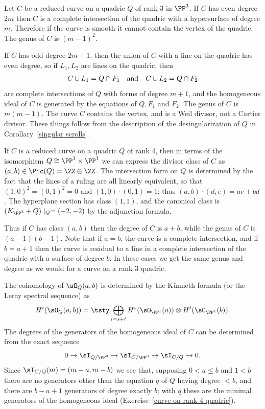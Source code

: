 \begin{example}
Let $C$ be a reduced curve on a quadric $Q$ of rank 3 in $\PP^{3}$. 
If $C$ has even degree $2m$ then $C$ is a complete intersection
of the quadric with a hypersurface of degree $m$. Therefore if the curve is smooth it cannot contain the vertex of the quadric. The genus of $C$ is $(m-1)^{2}$.

If $C$ has odd degree $2m+1$, then the union of $C$ with a line on the quadric has even degree,
so if $L_{1}, L_{2}$ are lines on the quadric, then 
$$
C\cup L_{1} = Q\cap F_{1} \quad\hbox{and}\quad C\cup L_{2} = Q\cap F_{2}
$$
are complete intersections of $Q$ with forms of degree $m+1$, and the homogeneous ideal of $C$ is generated by the equations
of $Q,F_{1}$ and $F_{2}$. The genus of $C$ is $m(m-1)$. The curve $C$ contains the vertex, and is a 
%
%
Weil divisor, not a Cartier divisor. These things follow from the description of the desingularization
of $Q$ in Corollary~\ref{singular scrolls}.
\end{example}

\begin{example}
\label{curves on quadrics}
If $C$ is a reduced curve on a quadric $Q$ of rank 4, then in terms of the isomorphism
$Q \cong \PP^{1}\times \PP^{1}$ we can express the divisor class of $C$ as $(a,b)\in \Pic(Q) = \ZZ\oplus \ZZ$.
The intersection form on $Q$ is determined by the fact that the lines of a ruling are all linearly equivalent,
so that $(1,0)^{2} = (0,1)^2=0$ and $(1,0)\cdot (0,1) = 1$; thus $(a,b)\cdot (d,e) = ae+bd$. The hyperplane section
has class $(1,1)$, and the canonical class is $(K_{\PP^{3}}+Q)\mid_{Q} = (-2,-2)$ by the adjunction formula. 

Thus
if $C$ has class $(a,b)$ then the degree of $C$ is $a+b$, while the genus of $C$ is $(a-1)(b-1)$. Note that 
if  $a =b$, the curve is a complete intersection, and if $b = a+1$ then the curve is residual to
a line in a complete intersection of the quadric with a surface of degree $b$. In these cases we get the same genus and degree as we would for a curve
on a rank 3 quadric.


The cohomology of $\sO_{Q}(a,b)$ is determined by the K\"unneth formula
%
%
(or the Leray spectral sequence) as
$$
H^{i}(\sO_{Q}(a,b)) = \tsty\bigoplus\limits_{i = s+t}H^{s}
(\sO_{\PP^{1}}(a))\otimes H^{t}(\sO_{\PP^{1}}(b)).
$$
The degrees of the generators of the homogeneous ideal of $C$ can be determined from the exact sequence
$$
0\to \sI_{Q/\PP^{3}} \to \sI_{C/\PP^{3}} \to \sI_{C/Q} \to 0.
$$
Since $ \sI_{C/Q} (m) = (m-a,m-b)$ we see that, supposing $0<a\leq b$ and $1<b$
there are no generators other than the equation $q$ of $Q$ having degree $<b$, and there are 
$b-a+1$ generators of degree exactly $b$; with $q$ these are the minimal generators of the homogeneous
ideal (Exercise~\ref{curve on rank 4 quadric}).
\end{example}

